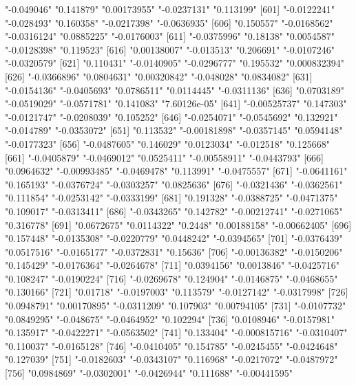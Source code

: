 \begin{Schunk}
\begin{Soutput}
[596] "-0.049046"    "0.141879"     "0.00173955"   "-0.0237131"   "0.113199"    
[601] "-0.0122241"   "-0.028493"    "0.160358"     "-0.0217398"   "-0.0636935"  
[606] "0.150557"     "-0.0168562"   "-0.0316124"   "0.0885225"    "-0.0176003"  
[611] "-0.0375996"   "0.18138"      "0.0054587"    "-0.0128398"   "0.119523"    
[616] "0.00138007"   "-0.013513"    "0.206691"     "-0.0107246"   "-0.0320579"  
[621] "0.110431"     "-0.0140905"   "-0.0296777"   "0.195532"     "0.000832394" 
[626] "-0.0366896"   "0.0804631"    "0.00320842"   "-0.048028"    "0.0834082"   
[631] "-0.0154136"   "-0.0405693"   "0.0786511"    "0.0114445"    "-0.0311136"  
[636] "0.0703189"    "-0.0519029"   "-0.0571781"   "0.141083"     "7.60126e-05" 
[641] "-0.00525737"  "0.147303"     "-0.0121747"   "-0.0208039"   "0.105252"    
[646] "-0.0254071"   "-0.0545692"   "0.132921"     "-0.014789"    "-0.0353072"  
[651] "0.113532"     "-0.00181898"  "-0.0357145"   "0.0594148"    "-0.0177323"  
[656] "-0.0487605"   "0.146029"     "0.0123034"    "-0.012518"    "0.125668"    
[661] "-0.0405879"   "-0.0469012"   "0.0525411"    "-0.00558911"  "-0.0443793"  
[666] "0.0964632"    "-0.00993485"  "-0.0469478"   "0.113991"     "-0.0475557"  
[671] "-0.0641161"   "0.165193"     "-0.0376724"   "-0.0303257"   "0.0825636"   
[676] "-0.0321436"   "-0.0362561"   "0.111854"     "-0.0253142"   "-0.0333199"  
[681] "0.191328"     "-0.0388725"   "-0.0471375"   "0.109017"     "-0.0313411"  
[686] "-0.0343265"   "0.142782"     "-0.00212741"  "-0.0271065"   "0.316778"    
[691] "0.0672675"    "0.0114322"    "0.2448"       "0.00188158"   "-0.00662405" 
[696] "0.157448"     "-0.0135308"   "-0.0220779"   "0.0448242"    "-0.0394565"  
[701] "-0.0376439"   "0.0517516"    "-0.0165177"   "-0.0372831"   "0.15636"     
[706] "-0.00136382"  "-0.0150206"   "0.145429"     "-0.0176364"   "-0.0264678"  
[711] "0.0394156"    "0.0013846"    "-0.0425716"   "0.108247"     "-0.0190224"  
[716] "-0.0269678"   "0.124904"     "-0.0146875"   "-0.0468655"   "0.130166"    
[721] "0.01718"      "-0.0197003"   "0.113579"     "-0.0127142"   "-0.0317998"  
[726] "0.0948791"    "0.00170895"   "-0.0311209"   "0.107903"     "0.00794105"  
[731] "-0.0107732"   "0.0849295"    "-0.048675"    "-0.0464952"   "0.102294"    
[736] "0.0108946"    "-0.0157981"   "0.135917"     "-0.0422271"   "-0.0563502"  
[741] "0.133404"     "-0.000815716" "-0.0310407"   "0.110037"     "-0.0165128"  
[746] "-0.0410405"   "0.154785"     "-0.0245455"   "-0.0424648"   "0.127039"    
[751] "-0.0182603"   "-0.0343107"   "0.116968"     "-0.0217072"   "-0.0487972"  
[756] "0.0984869"    "-0.0302001"   "-0.0426944"   "0.111688"     "-0.00441595" 

\end{Soutput}
\end{Schunk}
